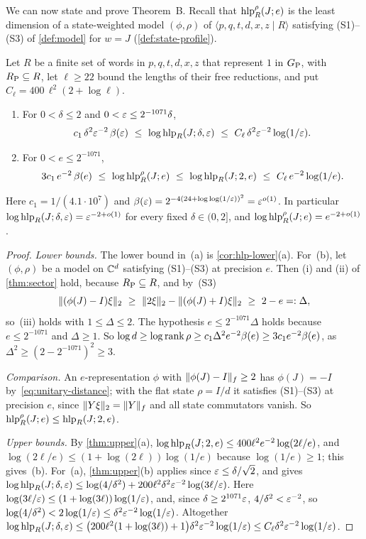 We can now state and prove Theorem~B. Recall that $\operatorname{hlp}^{\rho}_R(J;e)$ is the least dimension of a state-weighted model $(\phi,\rho)$ of
$\langle p,q,t,d,x,z\mid R\rangle$ satisfying (S1)--(S3) of \cref{def:model} for $w=J$ (\cref{def:state-profile}).

\begin{theorem}\label{thm:profile}
Let $R$ be a finite set of words in $p,q,t,d,x,z$ that represent $1$ in $G_{\mathrm P}$, with $R_{\mathrm P}\subseteq R$, let $\ell\ge22$ bound the lengths of
their free reductions, and put $C_\ell=400\,\ell^2(2+\log\ell)$.
\begin{enumerate}[label=(\alph*),itemsep=1pt]
\item For $0<\delta\le2$ and $0<\varepsilon\le2^{-1071}\delta$,
\[
c_1\,\delta^2\eps^{-2}\,\bfun(\eps)\ \le\ \log\hlp_R(J;\delta,\eps)\ \le\ C_\ell\,\delta^2\eps^{-2}\log(1/\eps).
\]
\item For $0<e\le2^{-1071}$,
\[
3c_1\,e^{-2}\,\bfun(e)\ \le\ \log\hlps_R(J;e)\ \le\ \log\hlp_R(J;2,e)\ \le\ C_\ell\,e^{-2}\log(1/e).
\]
\end{enumerate}
Here $c_1=1/(4.1\cdot10^7)$ and $\beta(\varepsilon)=2^{-4(24+\log\log(1/\varepsilon))^2}=\varepsilon^{o(1)}$. In particular
$\log\operatorname{hlp}_R(J;\delta,\varepsilon)=\varepsilon^{-2+o(1)}$ for every fixed $\delta\in(0,2]$, and $\log\operatorname{hlp}^{\rho}_R(J;e)=e^{-2+o(1)}$.
\end{theorem}

\begin{proof}
\emph{Lower bounds.} The lower bound in~(a) is \cref{cor:hlp-lower}(a). For~(b), let $(\phi,\rho)$ be a model on $\mathbb C^d$ satisfying
(S1)--(S3) at precision $e$. Then (i) and (ii) of \cref{thm:sector} hold, because $R_{\mathrm P}\subseteq R$, and by~(S3)
\[
\hs{(\phi(J)-I)\xi}\ \ge\ \hs{2\xi}-\hs{(\phi(J)+I)\xi}\ \ge\ 2-e=:\Delta ,
\]
so~(iii) holds with $1\le\Delta\le2$. The hypothesis $e\le2^{-1071}\Delta$ holds because $e\le2^{-1071}$ and $\Delta\ge1$. So
$\log d\ge\log\operatorname{rank}\rho\ge c_1\Delta^2e^{-2}\beta(e)\ge3c_1e^{-2}\beta(e)$, as $\Delta^2\ge(2-2^{-1071})^2\ge3$.

\emph{Comparison.} An $e$-representation $\phi$ with $\lVert \phi(J)-I\rVert_f\ge2$ has $\phi(J)=-I$ by~\eqref{eq:unitary-distance}; with the flat
state $\rho=I/d$ it satisfies (S1)--(S3) at precision $e$, since $\lVert Y\xi\rVert_2=\lVert Y\rVert_f$ and all state commutators vanish. So
$\operatorname{hlp}^{\rho}_R(J;e)\le\operatorname{hlp}_R(J;2,e)$.

\emph{Upper bounds.} By \cref{thm:upper}(a), $\log\operatorname{hlp}_R(J;2,e)\le400\ell^2e^{-2}\log(2\ell/e)$, and
$\log(2\ell/e)\le(1+\log(2\ell))\log(1/e)$ because $\log(1/e)\ge1$; this gives~(b). For~(a), \cref{thm:upper}(b) applies since
$\varepsilon\le\delta/\sqrt2$, and gives $\log\operatorname{hlp}_R(J;\delta,\varepsilon)\le\log(4/\delta^2)+200\ell^2\delta^2\varepsilon^{-2}\log(3\ell/\varepsilon)$. Here
$\log(3\ell/\varepsilon)\le(1+\log(3\ell))\log(1/\varepsilon)$, and, since $\delta\ge2^{1071}\varepsilon$, $4/\delta^2<\varepsilon^{-2}$, so
$\log(4/\delta^2)<2\log(1/\varepsilon)\le\delta^2\varepsilon^{-2}\log(1/\varepsilon)$. Altogether
$\log\operatorname{hlp}_R(J;\delta,\varepsilon)\le\bigl(200\ell^2(1+\log(3\ell))+1\bigr)\delta^2\varepsilon^{-2}\log(1/\varepsilon)\le C_\ell\delta^2\varepsilon^{-2}\log(1/\varepsilon)$.
\end{proof}

